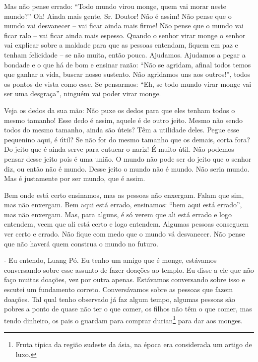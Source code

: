 Mas não pense errado: “Todo mundo virou monge, quem vai morar neste
mundo?” Oh! Ainda mais gente, Sr. Doutor! Não é assim! Não pense que o
mundo vai desvanecer – vai ficar ainda mais firme! Não pense que o
mundo vai ficar ralo – vai ficar ainda mais espesso. Quando o senhor
virar monge o senhor vai explicar sobre a maldade para que as pessoas
entendam, fiquem em paz e tenham felicidade – se não muita, então
pouca. Ajudamos. Ajudamos a pegar a bondade e o que há de bom e ensinar
razão: “Não se agridam, afinal todos temos que ganhar a vida, buscar
nosso sustento. Não agridamos uns aos outros!”, todos os pontos de
vista como esse. Se pensarmos: “Eh, se todo mundo virar monge vai ser
uma desgraça”, ninguém vai poder virar monge. 

Veja os dedos da sua mão: Não puxe os dedos para que eles tenham
todos o mesmo tamanho! Esse dedo é assim, aquele é de outro jeito.
Mesmo não sendo todos do mesmo tamanho, ainda são úteis? Têm a
utilidade deles. Pegue esse pequenino aqui, é útil? Se não for do mesmo
tamanho que os demais, corta fora? Do jeito que é ainda serve para
cutucar o nariz! É muito útil. Não podemos pensar desse jeito pois é
uma união. O mundo não pode ser do jeito que o senhor diz, ou então não
é mundo. Desse jeito o mundo não é mundo. Não seria mundo. Mas é
justamente por ser mundo, que é assim. 

Bem onde está certo ensinamos, mas as pessoas não enxergam. Falam
que sim, mas não enxergam. Bem aqui está errado, ensinamos: “bem aqui
está errado”, mas não enxergam. Mas, para alguns, é só verem que ali
está errado e logo entendem, veem que ali está certo e logo entendem.
Algumas pessoas conseguem ver certo e errado. Não fique com medo que o
mundo vá desvanecer. Não pense que não haverá quem construa o mundo no
futuro.

- Eu entendo, Luang Pó. Eu tenho um amigo que é monge, estávamos
conversando sobre esse assunto de fazer doações ao templo. Eu disse a
ele que não faço muitas doações, vez por outra apenas. Estávamos
conversando sobre isso e escutei um fundamento correto. Conversávamos
sobre as pessoas que fazem doações. Tal qual tenho observado já faz
algum tempo, algumas pessoas são pobres a ponto de quase não ter o que
comer, os filhos não têm o que comer, mas tendo dinheiro, os pais o
guardam para comprar durian\footnote{Fruta típica da região sudeste da
ásia, na época era considerada um artigo de luxo.} para dar aos monges.

